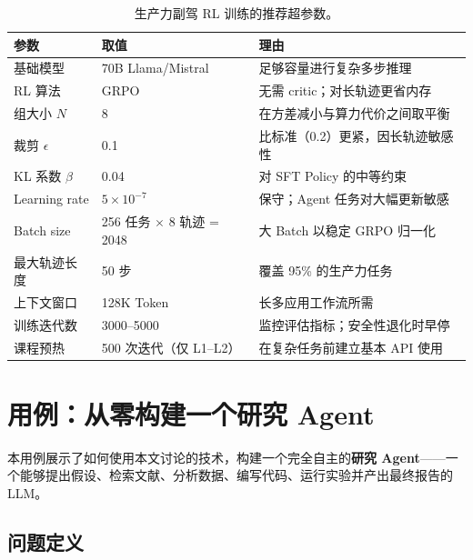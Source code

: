 \begin{table}[ht!]
\centering\small
\caption{生产力副驾 RL 训练的推荐超参数。}
\noindent\begin{tabularx}{\linewidth}{@{}l Z{0.71} Z{1.29}@{}}
\toprule
\textbf{参数} & \textbf{取值} & \textbf{理由} \\
\midrule
基础模型 & 70B Llama/Mistral & 足够容量进行复杂多步推理 \\
RL 算法 & GRPO & 无需 critic；对长轨迹更省内存 \\
组大小 $N$ & 8 & 在方差减小与算力代价之间取平衡 \\
裁剪 $\epsilon$ & 0.1 & 比标准（0.2）更紧，因长轨迹敏感性 \\
KL 系数 $\beta$ & 0.04 & 对 SFT Policy 的中等约束 \\
Learning rate & $5 \times 10^{-7}$ & 保守；Agent 任务对大幅更新敏感 \\
Batch size & 256 任务 $\times$ 8 轨迹 = 2048 & 大 Batch 以稳定 GRPO 归一化 \\
最大轨迹长度 & 50 步 & 覆盖 95\% 的生产力任务 \\
上下文窗口 & 128K Token & 长多应用工作流所需 \\
训练迭代数 & 3000--5000 & 监控评估指标；安全性退化时早停 \\
课程预热 & 500 次迭代（仅 L1--L2） & 在复杂任务前建立基本 API 使用 \\
\bottomrule
\end{tabularx}
\end{table}

\newpage
\section{用例：从零构建一个研究 Agent}
\label{use-case-building-a-research-agent-from-scratch}

本用例展示了如何使用本文讨论的技术，构建一个完全自主的\textbf{研究 Agent}——一个能够提出假设、检索文献、分析数据、编写代码、运行实验并产出最终报告的 LLM。

\subsection{问题定义}
\label{problem-definition}

